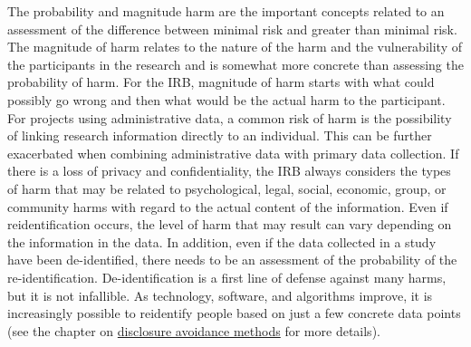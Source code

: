 \documentclass[
]{WileySix}
\begin{document}
The probability and magnitude harm are the important concepts related to an assessment of the difference between minimal risk and greater than minimal risk. The magnitude of harm relates to the nature of the harm and the vulnerability of the participants in the research and is somewhat more concrete than assessing the probability of harm. For the IRB, magnitude of harm starts with what could possibly go wrong and then what would be the actual harm to the participant. For projects using administrative data, a common risk of harm is the possibility of linking research information directly to an individual. This can be further exacerbated when combining administrative data with primary data collection. If there is a loss of privacy and confidentiality, the IRB always considers the types of harm that may be related to psychological, legal, social, economic, group, or community harms with regard to the actual content of the information. Even if reidentification occurs, the level of harm that may result can vary depending on the information in the data. In addition, even if the data collected in a study have been de-identified, there needs to be an assessment of the probability of the re-identification. De-identification is a first line of defense against many harms, but it is not infallible. As technology, software, and algorithms improve, it is increasingly possible to reidentify people based on just a few concrete data points (see the chapter on \protect\hyperlink{discavoid}{disclosure avoidance methods} for more details).
\end{document}

